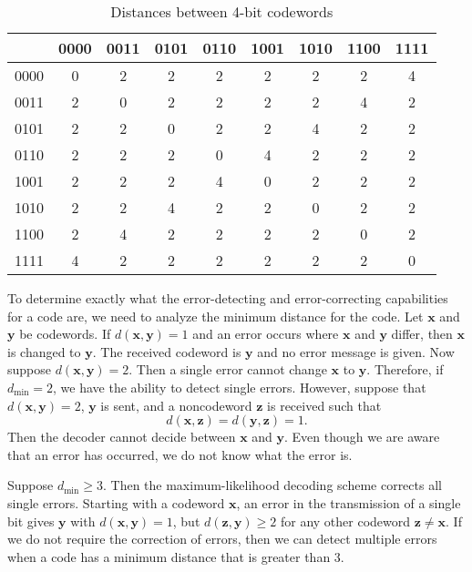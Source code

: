  
\begin{table}[hbt]
{\small
\begin{center}
\begin{tabular}{|c|cccccccc|}
\hline
    & 0000 & 0011 & 0101 & 0110 & 1001 & 1010 & 1100 & 1111
\\ \hline
0000 & 0 & 2 & 2 & 2 & 2 & 2 & 2 & 4 \\
0011 & 2 & 0 & 2 & 2 & 2 & 2 & 4 & 2 \\
0101 & 2 & 2 & 0 & 2 & 2 & 4 & 2 & 2 \\
0110 & 2 & 2 & 2 & 0 & 4 & 2 & 2 & 2 \\
1001 & 2 & 2 & 2 & 4 & 0 & 2 & 2 & 2 \\
1010 & 2 & 2 & 4 & 2 & 2 & 0 & 2 & 2 \\
1100 & 2 & 4 & 2 & 2 & 2 & 2 & 0 & 2 \\
1111 & 4 & 2 & 2 & 2 & 2 & 2 & 2 & 0 \\
\hline
\end{tabular}
\caption{Distances between 4-bit codewords}\label{4-bit_words}
\end{center}
}
\end{table}
 
 
 
To determine exactly what the error-detecting and error-correcting
capabilities for a code are, we need to analyze the minimum distance
for the code. Let ${\mathbf x}$ and ${\mathbf y}$ be codewords. If
$d({\mathbf x}, {\mathbf y}) = 1$ and an error occurs where ${\mathbf x}$
and ${\mathbf y}$ differ, then ${\mathbf x}$ is changed to ${\mathbf y}$.
The received codeword is ${\mathbf y}$ and no error message is given.
Now suppose $d({\mathbf x}, {\mathbf y}) = 2$. Then a single error cannot
change ${\mathbf x}$ to ${\mathbf y}$. Therefore, if $d_{\min} = 2$, we
have the ability to detect single errors. However, suppose that
$d({\mathbf x}, {\mathbf y}) = 2$, ${\mathbf y}$ is sent, and a noncodeword
${\mathbf z}$ is received such that
\[
d({\mathbf x}, {\mathbf z}) = d({\mathbf y}, {\mathbf z}) = 1.
\]
Then the decoder cannot decide between ${\mathbf x}$ and ${\mathbf y}$. Even
though we are aware that an error has occurred, we do not know what
the error is.
 
 
Suppose $d_{\min} \geq 3$. Then the maximum-likelihood decoding scheme
corrects all single errors. Starting with a codeword ${\mathbf x}$, an
error in the transmission of a single bit gives ${\mathbf y}$ with
$d({\mathbf x}, {\mathbf y}) = 1$, but $d({\mathbf z}, {\mathbf y}) \geq 2$
for any other codeword ${\mathbf z} \neq {\mathbf x}$. If we do not
require the correction of errors, then we can detect multiple errors
when a code has a minimum distance that is greater than 3.  
 

